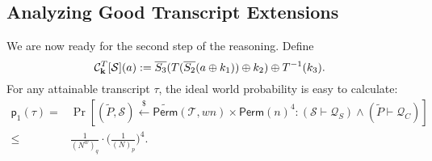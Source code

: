 \subsection{Analyzing Good Transcript Extensions}
\label{sec:good-tau-4-rounds}

We are now ready for the second step of the reasoning. Define
%
$$\mathcal{C}_{\mathbf{k}}^T[\mathcal{S}](a):=   \overline{S_3}(T(\overline{S_2}(a\oplus k_1))\oplus k_2)\oplus T^{-1}(k_3).$$
%
For any attainable transcript $\tau$, the ideal world probability is easy to calculate:
%
%
\begin{align*}
\mathsf{p}_{1}(\tau)=&\operatorname{Pr}\left[(\widetilde{P},\mathcal{S})\stackrel{\$}{\leftarrow} \widetilde{{\mathsf{Perm}}}(\mathcal{T}, w n)\times\mathsf{Perm}(n)^4: (\mathcal{S} \vdash \mathcal{Q}_{S}) \wedge(\widetilde{P} \vdash \mathcal{Q}_{C})  \right]		\\
\leq&\frac{1}{(N^w)_q}\cdot\bigg(\frac{1}{(N)_p}\bigg)^4.
\end{align*}



